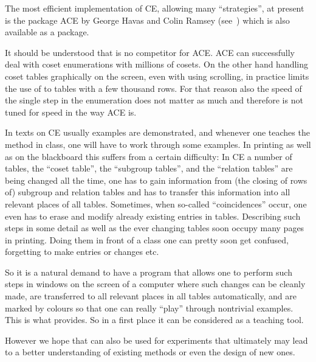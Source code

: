 The most efficient implementation of CE, allowing many ``strategies'',
at present is the package ACE by George Havas and Colin Ramsey
(see~\cite{Ram99}) which is also available as a {} package.

It should be understood that {\ITC} is no competitor for ACE. ACE can
successfully deal with coset enumerations with millions of cosets. On
the other hand handling coset tables graphically on the screen, even
with using scrolling, in practice limits the use of {\ITC} to
tables with a few thousand rows. For that reason also the speed of
the single step in the enumeration does not matter as much and {\ITC}
therefore is not tuned for speed in the way ACE is.



In texts on CE usually examples are demonstrated, and whenever one
teaches the method in class, one will have to work through some
examples. In printing as well as on the blackboard this suffers from
a certain difficulty: In CE a number of tables, the ``coset table'', the
``subgroup tables'', and the ``relation tables'' are being changed all the
time, one has to gain information from (the closing of rows of)
subgroup and relation tables and has to transfer this information into
all relevant places of all tables. Sometimes, when so-called
``coincidences'' occur, one even has to erase and modify already
existing entries in tables. Describing such steps in some detail as
well as the ever changing tables soon occupy many pages in printing.
Doing them in front of a class one can pretty soon get confused,
forgetting to make entries or changes etc.

So it is a natural demand to have a program that allows one to perform
such steps in windows on the screen of a computer where such changes
can be cleanly made, are transferred to all relevant places in all
tables automatically, and are marked by colours so that one can really
``play'' through nontrivial examples. This is what {\ITC} provides. So
in a first place it can be considered as a teaching tool.



However we hope that {\ITC} can also be used for experiments that
ultimately may lead to a better understanding of existing methods or
even the design of new ones.


